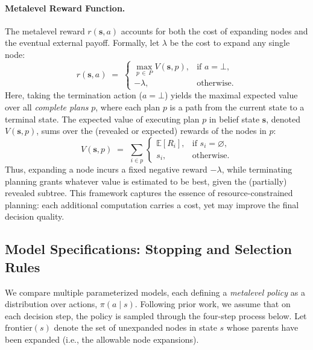 \documentclass[a4paper,12pt,oneside,article]{memoir}
\begin{document}
\paragraph{Metalevel Reward Function.}
The metalevel reward $r(\mathbf{s}, a)$ accounts for both the cost of expanding nodes and the eventual external payoff. Formally, let $\lambda$ be the cost to expand any single node:
\begin{equation}
r(\mathbf{s}, a) \;=\;
\begin{cases}
\displaystyle
\max_{p \,\in\, P} V(\mathbf{s}, p), & \text{if } a = \bot,\\[1em]
-\lambda, & \text{otherwise}.
\end{cases}
\label{eq:metalevel_reward_rewrite}
\end{equation}
Here, taking the termination action ($a = \bot$) yields the maximal expected value over all \emph{complete plans} $p$, where each plan $p$ is a path from the current state to a terminal state. The expected value of executing plan $p$ in belief state $\mathbf{s}$, denoted $V(\mathbf{s}, p)$, sums over the (revealed or expected) rewards of the nodes in $p$:
\begin{equation}
V(\mathbf{s}, p)
\;=\;
\sum_{\,i \in p\,}
\begin{cases}
\mathbb{E}[R_i], & \text{if } s_i = \varnothing,\\
s_i, & \text{otherwise}.
\end{cases}
\label{eq:Vsp_rewrite}
\end{equation}
Thus, expanding a node incurs a fixed negative reward $-\lambda$, while terminating planning grants whatever value is estimated to be best, given the (partially) revealed subtree. This framework captures the essence of resource-constrained planning: each additional computation carries a cost, yet may improve the final decision quality.

\subsection*{Model Specifications: Stopping and Selection Rules}

We compare multiple parameterized models, each defining a
\emph{metalevel policy} as a distribution over actions,
\( \pi(a \mid s) \). Following prior work, we assume that on
each decision step, the policy is sampled through the
four-step process below. Let \(\mathrm{frontier}(s)\) denote
the set of unexpanded nodes in state \(s\) whose parents
have been expanded (i.e., the allowable node expansions).
\end{document}
